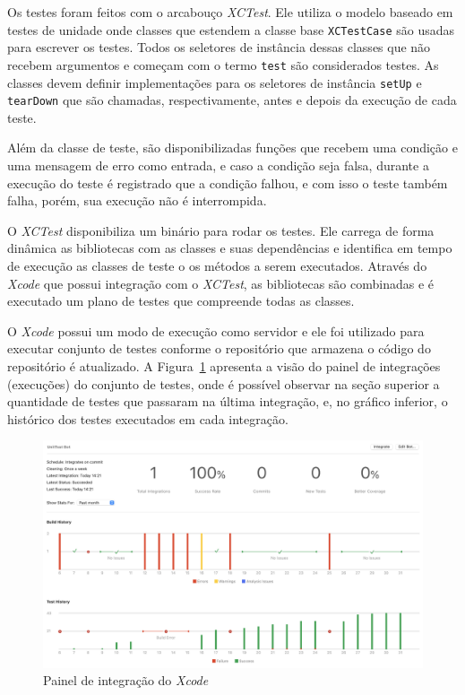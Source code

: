 Os testes foram feitos com o arcabouço \emph{XCTest}.
Ele utiliza o modelo baseado em testes de unidade onde 
classes que estendem a classe base \texttt{XCTestCase} são
usadas para escrever os testes.
Todos os seletores de instância dessas classes
que não recebem argumentos 
e começam com o termo \texttt{test} são considerados testes.
As classes devem definir implementações para os 
seletores de instância \texttt{setUp} e \texttt{tearDown}
que são chamadas, respectivamente, antes e depois da execução de cada 
teste.

Além da classe de teste, são disponibilizadas funções que
recebem uma condição e uma mensagem de erro como entrada, e 
caso a condição seja falsa, durante a execução do teste é
registrado que a condição falhou, e com isso o teste também falha, porém, sua execução não é interrompida.

O \emph{XCTest} disponibiliza um binário para rodar os testes.
Ele carrega de forma dinâmica as bibliotecas com as classes 
e suas dependências e identifica em tempo de execução as
classes de teste o os métodos a serem executados.
Através do \emph{Xcode} \citep{xcode} que possui
integração com o \emph{XCTest}, as bibliotecas são combinadas e é
executado um plano de testes que compreende todas as classes.

O \emph{Xcode} possui um modo de execução como servidor e ele
foi utilizado para executar conjunto de testes conforme o repositório
que armazena o código do repositório é atualizado.
A Figura~\ref{fig:int} apresenta a visão do painel de integrações
(execuções) do conjunto de testes, onde é possível observar na seção
superior a quantidade de testes que passaram na última integração,
e, no gráfico inferior, o histórico dos testes executados em cada integração.

\begin{figure}
  \centering
  \includegraphics[width=1\textwidth]{img}
  \caption{Painel de integração do \emph{Xcode} \label{fig:int}}
\end{figure}

